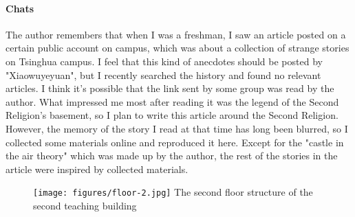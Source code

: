 \vfill

\paragraph{Chats} The author remembers that when I was a freshman, I saw an
article posted on a certain public account on campus, which was about a
collection of strange stories on Tsinghua campus. I feel that this kind of
anecdotes should be posted by "Xiaowuyeyuan", but I recently searched the
history and found no relevant articles. I think it's possible that the link
sent by some group was read by the author.  What impressed me most after
reading it was the legend of the Second Religion’s basement, so I plan to write
this article around the Second Religion. However, the memory of the story I
read at that time has long been blurred, so I collected some materials online
and reproduced it here.  Except for the "castle in the air theory" which was
made up by the author, the rest of the stories in the article were inspired by
collected materials.

\begin{figure}[!t]
	\centering
	\texttt{[image: figures/floor-2.jpg]}
	The second floor structure of the second teaching building
\end{figure}

